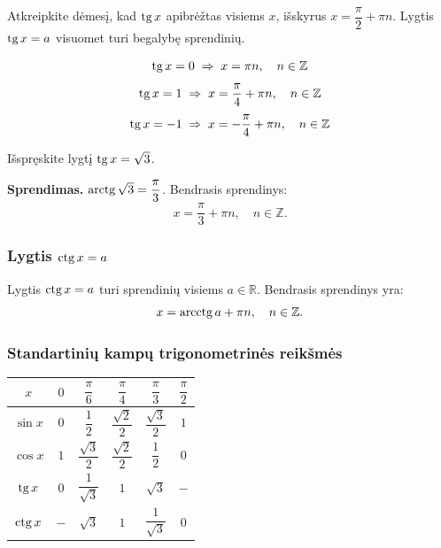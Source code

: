 \noindent Atkreipkite dėmesį, kad $\operatorname{tg} x$ apibrėžtas visiems $x$, išskyrus 
$x = \dfrac{\pi}{2} + \pi n$. Lygtis $\operatorname{tg} x = a$ visuomet turi begalybę sprendinių.

\begin{tcolorbox}[colback=green!5, colframe=green!50!black, title=Ypatingos reikšmės]
\[
\operatorname{tg} x = 0 \;\Rightarrow\; x = \pi n, \quad n \in \mathbb{Z}
\]
\[
\operatorname{tg} x = 1 \;\Rightarrow\; x = \frac{\pi}{4} + \pi n, \quad n \in \mathbb{Z}
\]
\[
\operatorname{tg} x = -1 \;\Rightarrow\; x = -\frac{\pi}{4} + \pi n, \quad n \in \mathbb{Z}
\]
\end{tcolorbox}

\begin{example}
Išspręskite lygtį $\operatorname{tg} x = \sqrt{3}$.

\textbf{Sprendimas.} $\operatorname{arctg}\sqrt{3} = \dfrac{\pi}{3}$. Bendrasis sprendinys:
\[
    x = \frac{\pi}{3} + \pi n, \quad n \in \mathbb{Z}.
\]
\end{example}

\subsubsection*{Lygtis \(\operatorname{ctg} x = a\)}

\begin{theorem}
Lygtis $\operatorname{ctg} x = a$ turi sprendinių visiems $a \in \mathbb{R}$. 
Bendrasis sprendinys yra:
\[
    x = \operatorname{arcctg} a + \pi n, \quad n \in \mathbb{Z}.
\]
\end{theorem}

\subsubsection*{Standartinių kampų trigonometrinės reikšmės}

\begin{center}
\begin{tabular}{|c|c|c|c|c|c|}
\hline
$x$ & $0$ & $\dfrac{\pi}{6}$ & $\dfrac{\pi}{4}$ & $\dfrac{\pi}{3}$ & $\dfrac{\pi}{2}$ \\[6pt]
\hline
$\sin x$ & $0$ & $\dfrac{1}{2}$ & $\dfrac{\sqrt{2}}{2}$ & $\dfrac{\sqrt{3}}{2}$ & $1$ \\[6pt]
\hline
$\cos x$ & $1$ & $\dfrac{\sqrt{3}}{2}$ & $\dfrac{\sqrt{2}}{2}$ & $\dfrac{1}{2}$ & $0$ \\[6pt]
\hline
$\operatorname{tg} x$  & $0$ & $\dfrac{1}{\sqrt{3}}$ & $1$ & $\sqrt{3}$ & $-$ \\[6pt]
\hline
$\operatorname{ctg} x$ & $-$ & $\sqrt{3}$ & $1$ & $\dfrac{1}{\sqrt{3}}$ & $0$ \\[6pt]
\hline
\end{tabular}
\end{center}


